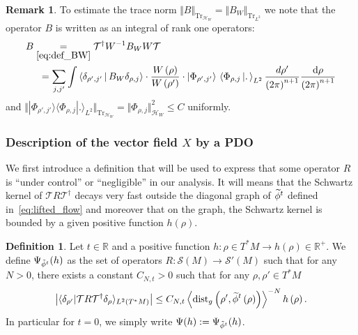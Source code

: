 \documentclass[10pt]{amsart}
\theoremstyle{definition}\newtheorem{defi}[theo]{Definition}\newtheorem{rema}[theo]{Remark}\newtheorem{exam}[theo]{Example}\newtheorem{exem}[theo]{Example}\newtheorem{nota}[theo]{Notation}
\newcommand{\clS}{\mathcal{S}}
\newcommand{\clT}{\mathcal{T}}
\newcommand{\clH}{\mathcal{H}}
\newcommand{\dist}{\mathrm{dist}}
\newcommand{\Tr}{\mathrm{Tr}}
\newcommand{\bbR}{\mathbb{R}}
\let\oldtilde\tilde
\renewcommand*{\tilde}[1]{\mathchoice{\widetilde{#1}}{\widetilde{#1}}{\oldtilde{#1}}{\oldtilde{#1}}}
\begin{document}
\begin{rema}\label{rem:To-estimate-the}
To estimate the trace norm $\Vert B\Vert _{\Tr_{\clH _{W}}}=\Vert B_{W}\Vert _{\Tr_{L^{2}}}$ we note that the operator $B$ is written as an integral of rank one operators:
\begin{equation}\label{eq:expression_integral_of_rankone}
\begin{split}
B &\underset{\eqref{eq:def_BW}}{=}  \clT^{\dagger}W^{-1}B_{W}W\clT
\\
& \mkern10mu= \sum_{j,j'}\int\left\langle\delta_{\rho',j'}\,\middle|\,B_{W}\delta_{\rho,j}\right\rangle\cdot\frac{W\left(\rho\right)}{W\left(\rho'\right)}\cdot\left|\Phi_{\rho',j'}\right\rangle\,\left\langle\Phi_{\rho,j}\,\middle|.\,\right\rangle_{L^{2}}\frac{d\rho'}{\left(2\pi\right)^{n+1}}\frac{\text{d\ensuremath{\rho}}}{\left(2\pi\right)^{n+1}}
\end{split}
\end{equation}
and $\Vert |\Phi_{\rho',j'}\rangle\langle\Phi_{\rho,j}|.\rangle_{L^{2}}\Vert _{\Tr_{\clH _{W}}}=\Vert \Phi_{\rho,j}\Vert _{\clH _{W}}^{2}\leq C$ uniformly.
\end{rema}


\subsubsection{Description of the vector field \texorpdfstring{$X$}{X} by a PDO}\label{subsec:Description-of-the}

We first introduce a definition that will be used to express that some operator $R$ is ``under control'' or ``negligible'' in our analysis. It will means that the Schwartz kernel of $\clT R\clT^{\dagger}$ decays very fast outside the diagonal graph of $\tilde{\phi}^{t}$ defined in~\eqref{eq:lifted_flow} and moreover that on the graph, the Schwartz kernel is bounded by a given positive function $h(\rho)$.

\begin{cBoxA}{}
\begin{defi}\label{def:Let--be-1}
Let $t\in\bbR$ and a positive function $h:\rho\in T^{*}M\rightarrow h(\rho)\in\bbR^{+}$. We define $\Psi_{\tilde{\phi}^{t}}(h)$ as the set of operators $R:\clS(M)\rightarrow\clS'(M)$ such that for any $N>0$, there exists a constant $C_{N,t}>0$ such that for any $\rho,\rho'\in T^{*}M$
\begin{equation}\label{eq:microl_estimate-2}
\left|\langle\delta_{\rho'}|\clT R\clT^{\dagger}\delta_{\rho}\rangle_{L^{2}\left(T^{*}M\right)}\right| \leq C_{N,t}\left\langle \dist_{g}\left(\rho',\tilde{\phi}^{t}\left(\rho\right)\right)\right\rangle ^{-N}h\left(\rho\right).
\end{equation}
In particular for $t=0$, we simply write $\Psi(h):=\Psi_{\tilde{\phi}^{t}}(h)$.
\end{defi}
\end{cBoxA}
\end{document}
